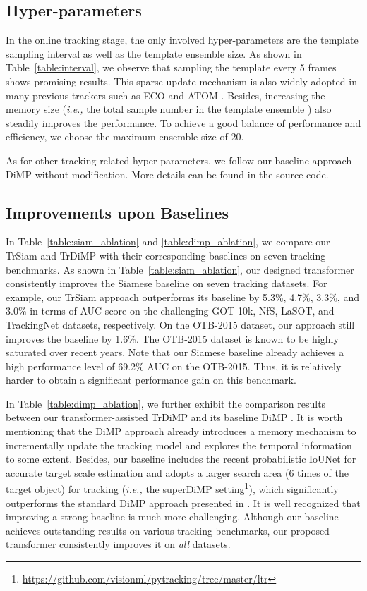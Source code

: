 \documentclass[10pt,twocolumn,letterpaper]{article}
\begin{document}
\subsection{Hyper-parameters}


In the online tracking stage, the only involved hyper-parameters are the template sampling interval as well as the template ensemble size.
As shown in Table~\ref{table:interval}, we observe that sampling the template every 5 frames shows promising results.
This sparse update mechanism is also widely adopted in many previous trackers such as ECO \cite{ECO} and ATOM \cite{ATOM}.
Besides, increasing the memory size (\emph{i.e.,} the total sample number in the template ensemble ) also steadily improves the performance.
To achieve a good balance of performance and efficiency, we choose the maximum ensemble size of 20. 




As for other tracking-related hyper-parameters, we follow our baseline approach DiMP \cite{DiMP} without modification.
More details can be found in the source code.



\subsection{Improvements upon Baselines}
In Table~\ref{table:siam_ablation} and \ref{table:dimp_ablation}, we compare our TrSiam and TrDiMP with their corresponding baselines on seven tracking benchmarks.
As shown in Table~\ref{table:siam_ablation}, our designed transformer consistently improves the Siamese baseline on seven tracking datasets.
For example, our TrSiam approach outperforms its baseline by 5.3\%, 4.7\%, 3.3\%, and 3.0\% in terms of AUC score on the challenging GOT-10k, NfS, LaSOT, and TrackingNet datasets, respectively.
On the OTB-2015 dataset, our approach still improves the baseline by 1.6\%.
The OTB-2015 dataset is known to be highly saturated over recent years. 
Note that our Siamese baseline already achieves a high performance level of 69.2\% AUC on the OTB-2015. 
Thus, it is relatively harder to obtain a significant performance gain on this benchmark.



In Table~\ref{table:dimp_ablation}, we further exhibit the comparison results between our transformer-assisted TrDiMP and its baseline DiMP \cite{DiMP}.
It is worth mentioning that the DiMP approach already introduces a memory mechanism to incrementally update the tracking model and explores the temporal information to some extent.  
Besides, our baseline includes the recent probabilistic IoUNet \cite{PrDiMP} for accurate target scale estimation and adopts a larger search area (6 times of the target object) for tracking (\emph{i.e.,} the superDiMP setting\footnote{\url{https://github.com/visionml/pytracking/tree/master/ltr}}), which significantly outperforms the standard DiMP approach presented in \cite{DiMP} .
It is well recognized that improving a strong baseline is much more challenging.
Although our baseline achieves outstanding results on various tracking benchmarks, our proposed transformer consistently improves it on \emph{all} datasets.
\end{document}
